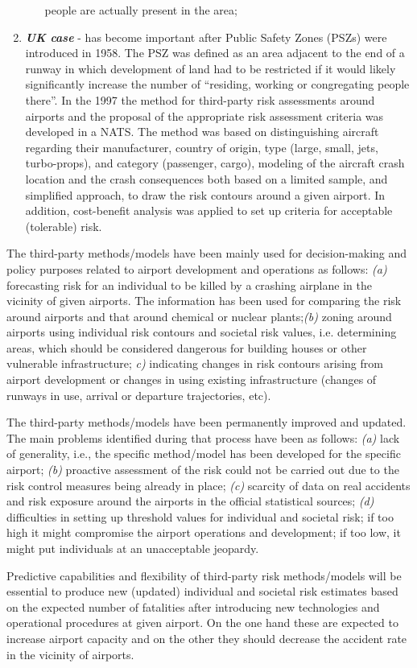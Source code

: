\documentclass[a4paper, 10pt]{article}
\begin{document}
\begin{enumerate}
\begin{enumerate}
				people are actually present in the area;
				\end{enumerate}
		\item \textit{\textbf{UK case}} - has become important after Public Safety
				Zones (PSZs) were introduced in 1958. The PSZ was defined
				as an area adjacent to the end of a runway in which
				development of land had to be restricted if it would likely
				significantly increase the number of “residing, working or
				congregating people there”. In the 1997 the method for
				third-party risk assessments around airports and the proposal of
				the appropriate risk assessment criteria was developed in a
				NATS. The method was based on distinguishing aircraft
				regarding their manufacturer, country of origin, type (large,
				small, jets, turbo-props), and category (passenger, cargo),
				modeling of the aircraft crash location and the crash
				consequences both based on a limited sample, and simplified
				approach, to draw the risk contours around a given airport. In
				addition, cost-benefit analysis was applied to set up criteria for
				acceptable (tolerable) risk.
\end{enumerate}\par
The third-party methods/models have been mainly used for
decision-making and policy purposes related to airport
development and operations as follows: \textit{(a)} forecasting risk for
an individual to be killed by a crashing airplane in the vicinity
of given airports. The information has been used for comparing
the risk around airports and that around chemical or nuclear
plants;\textit{(b)} zoning around airports using individual risk contours and societal risk values, i.e. determining areas, which should be
considered dangerous for building houses or other vulnerable
infrastructure; \textit{c)} indicating changes in risk contours arising
from airport development or changes in using existing
infrastructure (changes of runways in use, arrival or departure
trajectories, etc).\par

The third-party methods/models have been permanently
improved and updated. The main problems identified during
that process have been as follows: \textit{(a)} lack of generality,
i.e., the specific method/model has been developed for the
specific airport; \textit{(b)} proactive assessment of the risk could not
be carried out due to the risk control measures being already in
place; \textit{(c)} scarcity of data on real accidents and risk exposure
around the airports in the official statistical sources; \textit{(d)}
difficulties in setting up threshold values for individual and
societal risk; if too high it might compromise the airport
operations and development; if too low, it might put
individuals at an unacceptable jeopardy.\par

Predictive capabilities and flexibility of third-party risk
methods/models will be essential to produce new (updated)
individual and societal risk estimates based on the expected
number of fatalities after introducing new technologies and
operational procedures at given airport. On the one hand these
are expected to increase airport capacity and on the other they
should decrease the accident rate in the vicinity of airports.
\end{document}
